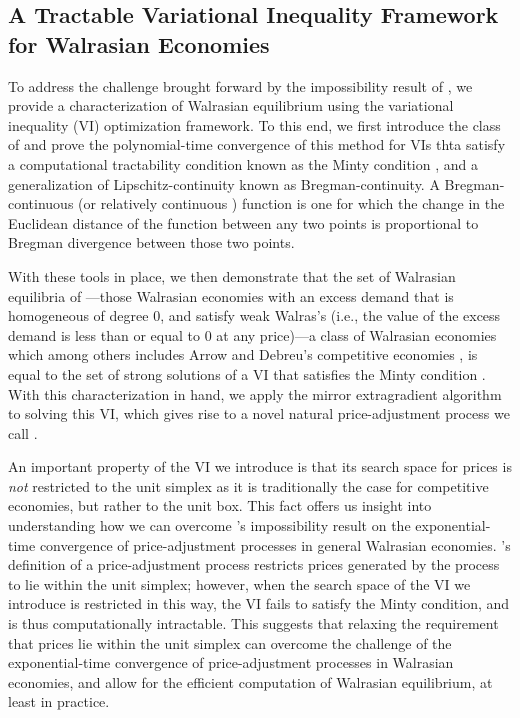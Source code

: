 \subsection{A Tractable Variational Inequality Framework for Walrasian Economies}
To address the challenge brought forward by the impossibility result of \citet{papadimitriou2010impossibility}, we provide a characterization of Walrasian equilibrium using the variational inequality (VI) optimization framework. To this end, we first introduce the class of  and prove the polynomial-time convergence of this method for VIs thta satisfy a computational tractability condition known as the Minty condition \cite{minty1967generalization}, and a generalization of Lipschitz-continuity known as Bregman-continuity. A Bregman-continuous (or relatively continuous \cite{lu2019relative}) function is one for which the change in the Euclidean distance of the function between any two points is proportional to Bregman divergence between those two points. 

With these tools in place, we then demonstrate that the set of Walrasian equilibria of ---those Walrasian economies with an excess demand that is homogeneous of degree $0$, and satisfy weak Walras's (i.e., the value of the excess demand is less than or equal to $0$ at any price)---a class of Walrasian economies which among others includes Arrow and Debreu's competitive economies \cite{arrow-debreu}, is equal to the set of strong solutions of a VI that satisfies the Minty condition \cite{minty1967generalization}. With this characterization in hand, we apply the mirror extragradient algorithm to solving this VI, which gives rise to a novel natural price-adjustment process we call .

An important property of the VI we introduce is that its search space for prices is \emph{not\/} restricted to the unit simplex as it is traditionally the case for competitive economies, but rather to the unit box. This fact offers us insight into understanding how we can overcome \citeauthor{papadimitriou2010impossibility}'s impossibility result on the exponential-time convergence of price-adjustment processes in general Walrasian economies. \citeauthor{papadimitriou2010impossibility}'s definition of a price-adjustment process restricts prices generated by the process to lie within the unit simplex; however, when the search space of the VI we introduce is restricted in this way, the VI fails to satisfy the Minty condition, and is thus computationally intractable. This suggests that relaxing the requirement that prices lie within the unit simplex can overcome the challenge of the exponential-time convergence of price-adjustment processes in Walrasian economies, and allow for the efficient computation of Walrasian equilibrium, at least in practice.

